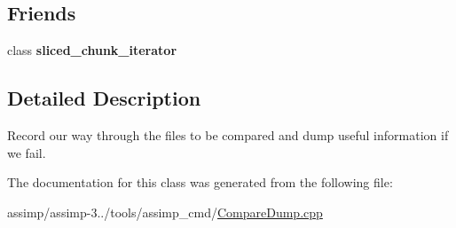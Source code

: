 \subsection*{Friends}
\begin{DoxyCompactItemize}
\item 
\hypertarget{classcomparer__context_a0ca06d6668213e2de88464ac5c364841}{class {\bfseries sliced\+\_\+chunk\+\_\+iterator}}\label{classcomparer__context_a0ca06d6668213e2de88464ac5c364841}

\end{DoxyCompactItemize}


\subsection{Detailed Description}
Record our way through the files to be compared and dump useful information if we fail. 

The documentation for this class was generated from the following file\+:\begin{DoxyCompactItemize}
\item 
assimp/assimp-\/3../tools/assimp\+\_\+cmd/\hyperlink{_compare_dump_8cpp}{Compare\+Dump.\+cpp}\end{DoxyCompactItemize}
